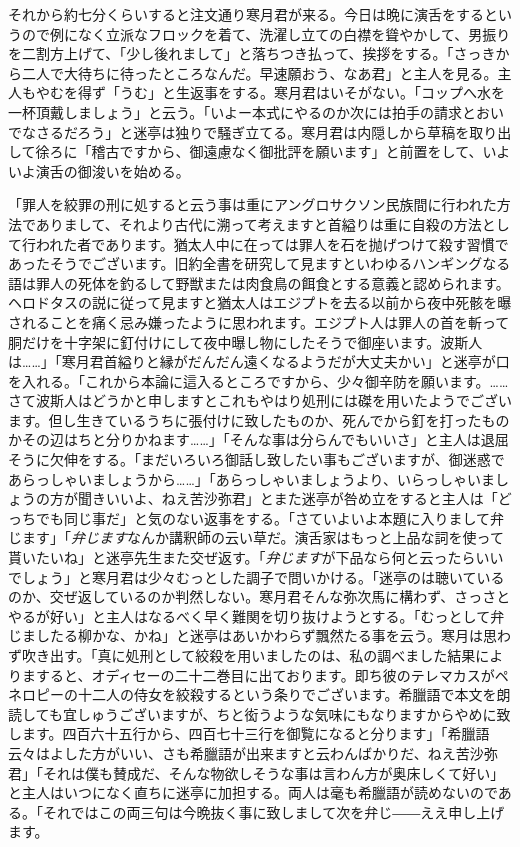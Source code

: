 \documentclass[12pt, openright]{book}
\begin{document}
それから約七分くらいすると注文通り寒月君が来る。今日は晩に演舌をするというので例になく立派なフロックを着て、洗濯し立ての白襟を聳やかして、男振りを二割方上げて、「少し後れまして」と落ちつき払って、挨拶をする。「さっきから二人で大待ちに待ったところなんだ。早速願おう、なあ君」と主人を見る。主人もやむを得ず「うむ」と生返事をする。寒月君はいそがない。「コップへ水を一杯頂戴しましょう」と云う。「いよー本式にやるのか次には拍手の請求とおいでなさるだろう」と迷亭は独りで騒ぎ立てる。寒月君は内隠しから草稿を取り出して徐ろに「稽古ですから、御遠慮なく御批評を願います」と前置をして、いよいよ演舌の御浚いを始める。

「罪人を絞罪の刑に処すると云う事は重にアングロサクソン民族間に行われた方法でありまして、それより古代に溯って考えますと首縊りは重に自殺の方法として行われた者であります。猶太人中に在っては罪人を石を抛げつけて殺す習慣であったそうでございます。旧約全書を研究して見ますといわゆるハンギングなる語は罪人の死体を釣るして野獣または肉食鳥の餌食とする意義と認められます。ヘロドタスの説に従って見ますと猶太人はエジプトを去る以前から夜中死骸を曝されることを痛く忌み嫌ったように思われます。エジプト人は罪人の首を斬って胴だけを十字架に釘付けにして夜中曝し物にしたそうで御座います。波斯人は\ldots{}\ldots{}」「寒月君首縊りと縁がだんだん遠くなるようだが大丈夫かい」と迷亭が口を入れる。「これから本論に這入るところですから、少々御辛防を願います。\ldots{}\ldots{}さて波斯人はどうかと申しますとこれもやはり処刑には磔を用いたようでございます。但し生きているうちに張付けに致したものか、死んでから釘を打ったものかその辺はちと分りかねます\ldots{}\ldots{}」「そんな事は分らんでもいいさ」と主人は退屈そうに欠伸をする。「まだいろいろ御話し致したい事もございますが、御迷惑であらっしゃいましょうから\ldots{}\ldots{}」「あらっしゃいましょうより、いらっしゃいましょうの方が聞きいいよ、ねえ苦沙弥君」とまた迷亭が咎め立をすると主人は「どっちでも同じ事だ」と気のない返事をする。「さていよいよ本題に入りまして弁じます」「\emph{弁じます}なんか講釈師の云い草だ。演舌家はもっと上品な詞を使って貰いたいね」と迷亭先生また交ぜ返す。「\emph{弁じます}が下品なら何と云ったらいいでしょう」と寒月君は少々むっとした調子で問いかける。「迷亭のは聴いているのか、交ぜ返しているのか判然しない。寒月君そんな弥次馬に構わず、さっさとやるが好い」と主人はなるべく早く難関を切り抜けようとする。「むっとして弁じましたる柳かな、かね」と迷亭はあいかわらず飄然たる事を云う。寒月は思わず吹き出す。「真に処刑として絞殺を用いましたのは、私の調べました結果によりますると、オディセーの二十二巻目に出ております。即ち彼のテレマカスがペネロピーの十二人の侍女を絞殺するという条りでございます。希臘語で本文を朗読しても宜しゅうございますが、ちと衒うような気味にもなりますからやめに致します。四百六十五行から、四百七十三行を御覧になると分ります」「希臘語云々はよした方がいい、さも希臘語が出来ますと云わんばかりだ、ねえ苦沙弥君」「それは僕も賛成だ、そんな物欲しそうな事は言わん方が奥床しくて好い」と主人はいつになく直ちに迷亭に加担する。両人は毫も希臘語が読めないのである。「それではこの両三句は今晩抜く事に致しまして次を弁じ――ええ申し上げます。
\end{document}
